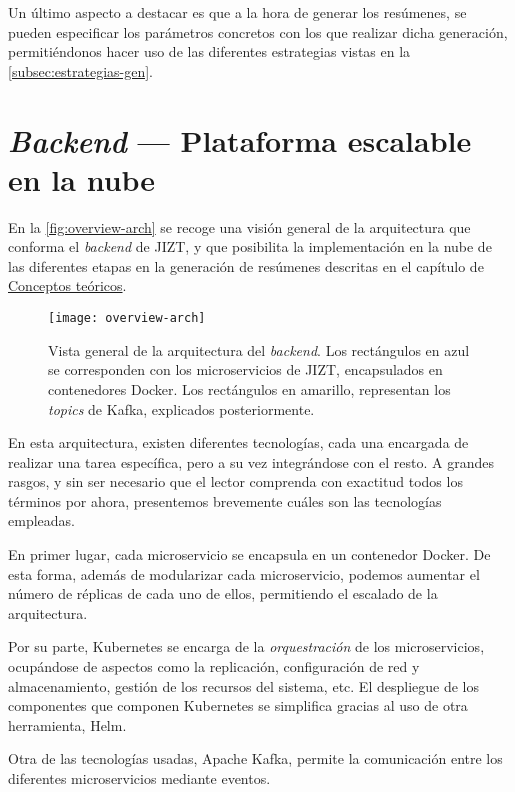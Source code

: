 Un último aspecto a destacar es que a la hora de generar los resúmenes, se pueden especificar los parámetros concretos con los que realizar dicha generación, permitiéndonos hacer uso de las diferentes estrategias vistas en la \autoref{subsec:estrategias-gen}.

\section{\emph{Backend} --- Plataforma escalable en la nube} \label{sec:backend}

En la \autoref{fig:overview-arch} se recoge una visión general de la arquitectura que conforma el \emph{backend} de JIZT, y que posibilita la implementación en la nube de las diferentes etapas en la generación de resúmenes descritas en el capítulo de \hyperref[chapter:conceptos]{Conceptos teóricos}.

\begin{figure}[!h]
	\centering
	\texttt{[image: overview-arch]}
	\caption[Vista general de la arquitectura del \emph{backend}.]{Vista general de la arquitectura del \emph{backend}. Los rectángulos en azul se corresponden con los microservicios de JIZT, encapsulados en contenedores Docker. Los rectángulos en amarillo, representan los \emph{topics} de Kafka, explicados posteriormente.}
	\label{fig:overview-arch}
\end{figure}

En esta arquitectura, existen diferentes tecnologías, cada una encargada de realizar una tarea específica, pero a su vez integrándose con el resto. A grandes rasgos, y sin ser necesario que el lector comprenda con exactitud todos los términos por ahora, presentemos brevemente cuáles son las tecnologías empleadas.

En primer lugar, cada microservicio se encapsula en un contenedor Docker. De esta forma, además de modularizar cada microservicio, podemos aumentar el número de réplicas de cada uno de ellos, permitiendo el escalado de la arquitectura.

Por su parte, Kubernetes se encarga de la \emph{orquestración} de los microservicios, ocupándose de aspectos como la replicación, configuración de red y almacenamiento, gestión de los recursos del sistema, etc. El despliegue de los componentes que componen Kubernetes se simplifica gracias al uso de otra herramienta, Helm.

Otra de las tecnologías usadas, Apache Kafka, permite la comunicación entre los diferentes microservicios mediante eventos.

